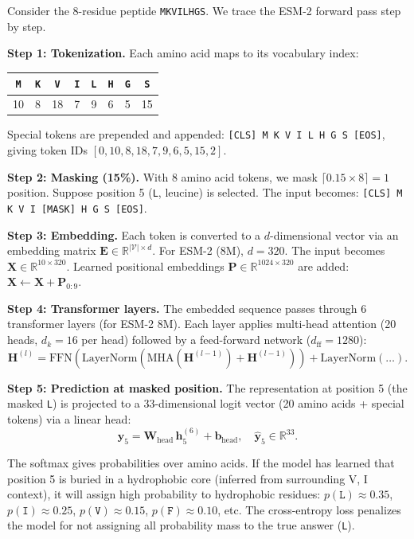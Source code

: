 \begin{example}
Consider the 8-residue peptide \texttt{MKVILHGS}. We trace the ESM-2 forward pass step by step.

\textbf{Step 1: Tokenization.} Each amino acid maps to its vocabulary index:

\begin{center}
\begin{tabular}{cccccccc}
\texttt{M} & \texttt{K} & \texttt{V} & \texttt{I} & \texttt{L} & \texttt{H} & \texttt{G} & \texttt{S} \\
\midrule
10 & 8 & 18 & 7 & 9 & 6 & 5 & 15
\end{tabular}
\end{center}

Special tokens are prepended and appended: \texttt{[CLS] M K V I L H G S [EOS]}, giving token IDs $[0, 10, 8, 18, 7, 9, 6, 5, 15, 2]$.

\textbf{Step 2: Masking (15\%).} With 8 amino acid tokens, we mask $\lceil 0.15 \times 8 \rceil = 1$ position. Suppose position 5 (\texttt{L}, leucine) is selected. The input becomes: \texttt{[CLS] M K V I [MASK] H G S [EOS]}.

\textbf{Step 3: Embedding.} Each token is converted to a $d$-dimensional vector via an embedding matrix $\mathbf{E} \in \mathbb{R}^{|\mathcal{V}| \times d}$. For ESM-2 (8M), $d = 320$. The input becomes $\mathbf{X} \in \mathbb{R}^{10 \times 320}$. Learned positional embeddings $\mathbf{P} \in \mathbb{R}^{1024 \times 320}$ are added: $\mathbf{X} \leftarrow \mathbf{X} + \mathbf{P}_{0:9}$.

\textbf{Step 4: Transformer layers.} The embedded sequence passes through 6 transformer layers (for ESM-2 8M). Each layer applies multi-head attention (20 heads, $d_k = 16$ per head) followed by a feed-forward network ($d_{\text{ff}} = 1280$):
\[
\mathbf{H}^{(l)} = \text{FFN}\!\left(\text{LayerNorm}\!\left(\text{MHA}(\mathbf{H}^{(l-1)}) + \mathbf{H}^{(l-1)}\right)\right) + \text{LayerNorm}(\ldots).
\]

\textbf{Step 5: Prediction at masked position.} The representation at position 5 (the masked \texttt{L}) is projected to a 33-dimensional logit vector (20 amino acids + special tokens) via a linear head:
\[
\hat{\mathbf{y}}_5 = \mathbf{W}_{\text{head}} \, \mathbf{h}_5^{(6)} + \mathbf{b}_{\text{head}}, \quad \hat{\mathbf{y}}_5 \in \mathbb{R}^{33}.
\]

The softmax gives probabilities over amino acids. If the model has learned that position 5 is buried in a hydrophobic core (inferred from surrounding V, I context), it will assign high probability to hydrophobic residues: $p(\texttt{L}) \approx 0.35$, $p(\texttt{I}) \approx 0.25$, $p(\texttt{V}) \approx 0.15$, $p(\texttt{F}) \approx 0.10$, etc. The cross-entropy loss penalizes the model for not assigning all probability mass to the true answer (\texttt{L}).
\end{example}

